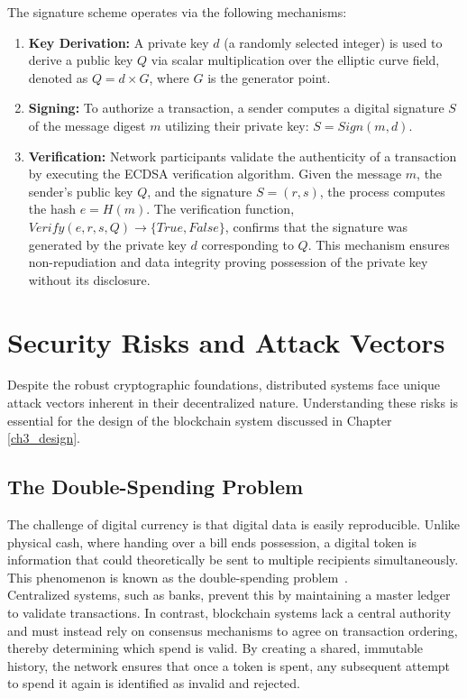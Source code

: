 The signature scheme operates via the following mechanisms:
\begin{enumerate}
    \item \textbf{Key Derivation:} A private key $d$ (a randomly selected integer) is used to derive a public key $Q$ via scalar multiplication over the elliptic curve field, denoted as $Q = d \times G$, where $G$ is the generator point.
    \item \textbf{Signing:} To authorize a transaction, a sender computes a digital signature $S$ of the message digest $m$ utilizing their private key: $S = Sign(m, d)$.
    \item \textbf{Verification:} Network participants validate the authenticity of a transaction by executing the ECDSA verification algorithm. Given the message $m$, the sender's public key $Q$, and the signature $S = (r, s)$, the process computes the hash $e = H(m)$. The verification function, $Verify(e, r, s, Q) \rightarrow \{True, False\}$, confirms that the signature was generated by the private key $d$ corresponding to $Q$. This mechanism ensures non-repudiation and data integrity proving possession of the private key without its disclosure.

\end{enumerate}


\section{Security Risks and Attack Vectors} \label{ch2_security_risks}

Despite the robust cryptographic foundations, distributed systems face unique attack vectors inherent in their decentralized nature. Understanding these risks is essential for the design of the blockchain system discussed in Chapter \ref{ch3_design}.

\subsection{The Double-Spending Problem}
The challenge of digital currency is that digital data is easily reproducible. Unlike physical cash, where handing over a bill ends possession, a digital token is information that could theoretically be sent to multiple recipients simultaneously. This phenomenon is known as the double-spending problem~\cite{doublespending}. \\Centralized systems, such as banks, prevent this by maintaining a master ledger to validate transactions. In contrast, blockchain systems lack a central authority and must instead rely on consensus mechanisms to agree on transaction ordering, thereby determining which spend is valid. By creating a shared, immutable history, the network ensures that once a token is spent, any subsequent attempt to spend it again is identified as invalid and rejected.

